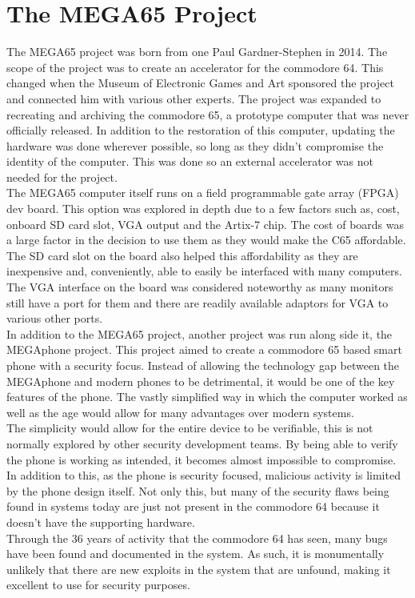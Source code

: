 
\section{The MEGA65 Project}

\label{Ch2 Sec4}

The MEGA65 project was born from one Paul Gardner-Stephen in 2014. The scope of the project was to create an accelerator for the commodore 64. This changed when the Museum of Electronic Games and Art sponsored the project and connected him with various other experts.\cite{Reference27} The project was expanded to recreating and archiving the commodore 65, a prototype computer that was never officially released. In addition to the restoration of this computer, updating the hardware was done wherever possible, so long as they didn’t compromise the identity of the computer.\cite{Reference27} This was done so an external accelerator was not needed for the project.\\
The MEGA65 computer itself runs on a field programmable gate array (FPGA) dev board. This option was explored in depth due to a few factors such as, cost, onboard SD card slot, VGA output and the Artix-7 chip. The cost of boards was a large factor in the decision to use them as they would make the C65 affordable. The SD card slot on the board also helped this affordability as they are inexpensive and, conveniently, able to easily be interfaced with many computers. The VGA interface on the board was considered noteworthy as many monitors still have a port for them and there are readily available adaptors for VGA to various other ports.\cite{Reference27}\\
In addition to the MEGA65 project, another project was run along side it, the MEGAphone project. This project aimed to create a commodore 65 based smart phone with a security focus. Instead of allowing the technology gap between the MEGAphone and modern phones to be detrimental, it would be one of the key features of the phone. The vastly simplified way in which the computer worked as well as the age would allow for many advantages over modern systems.\\ 
The simplicity would allow for the entire device to be verifiable, this is not normally explored by other security development teams. By being able to verify the phone is working as intended, it becomes almost impossible to compromise. In addition to this, as the phone is security focused, malicious activity is limited by the phone design itself. Not only this, but many of the security flaws being found in systems today are just not present in the commodore 64 because it doesn’t have the supporting hardware.\\
Through the 36 years of activity that the commodore 64 has seen, many bugs have been found and documented in the system. As such, it is monumentally unlikely that there are new exploits in the system that are unfound, making it excellent to use for security purposes.

